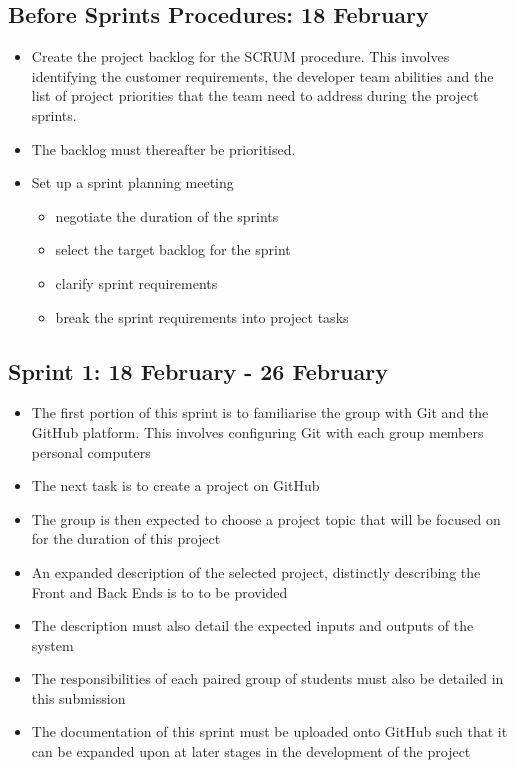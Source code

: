 \documentclass[10pt, a4paper, onecolumn]{scrartcl}
\begin{document}
		\subsection{Before Sprints Procedures: 18 February}
			
			\begin{itemize}
				\item Create the project backlog for the SCRUM procedure. This involves identifying the customer requirements, the developer team abilities and the list of project priorities that the team need to address during the project sprints. 
				\item The backlog must thereafter be prioritised. 
				\item Set up a sprint planning meeting
					\begin{itemize}
						\item negotiate the duration of the sprints 
						\item select the target backlog for the sprint
						\item clarify sprint requirements
						\item break the sprint requirements into project tasks
					\end{itemize}
			\end{itemize}
		
		\subsection{Sprint 1: 18 February - 26 February}
		
			\begin{itemize}[noitemsep]
				\item The first portion of this sprint is to familiarise the group with Git and the GitHub platform. This involves configuring Git with each group members personal computers 
				\item The next task is to create a project on GitHub
				\item The group is then expected to choose a project topic that will be focused on for the duration of this project
				\item An expanded description of the selected project, distinctly describing the Front and Back Ends is to to be provided
				\item The description must also detail the expected inputs and outputs of the system
				\item The responsibilities of each paired group of students must also be detailed in this submission
				\item The documentation of this sprint must be uploaded onto GitHub such that it can be expanded upon at later stages in the development of the project
			\end{itemize}
			
\end{document}
